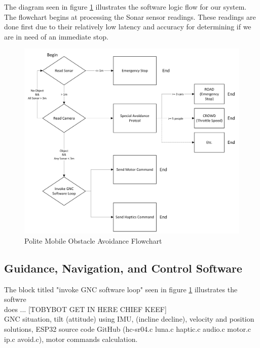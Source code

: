 \noindent The diagram seen in figure \ref{fig:Polite-Mobile-Obstacle-Avoidance-Flowchart} illustrates the software logic flow for our system. \\

\noindent The flowchart begins at processing the Sonar sensor readings. These readings are done first due to their relatively low latency and accuracy for determining if we are in need of an immediate stop.  \\

\begin{figure}[H]
	\centering
	\includegraphics[width=1.0\textwidth]{./Images/Polite-Mobile-Obstacle-Avoidance-Flowchart.png}
	\caption{\label{fig:Polite-Mobile-Obstacle-Avoidance-Flowchart}Polite Mobile Obstacle Avoidance Flowchart}
\end{figure}

\subsection{Guidance, Navigation, and Control Software}
\noindent The block titled "invoke GNC software loop" seen in figure \ref{fig:Polite-Mobile-Obstacle-Avoidance-Flowchart} illustrates the softwre \\  does ... [TOBYBOT GET IN HERE CHIEF KEEF] \\


\noindent GNC situation, tilt (attitude) using IMU, (incline decline), velocity and position solutions, ESP32 source code GitHub (hc-sr04.c luna.c haptic.c audio.c motor.c ip.c avoid.c), motor commands calculation. \\


